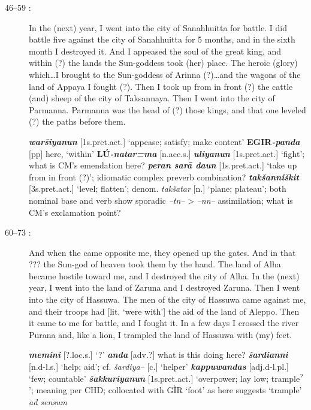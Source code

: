 \documentclass[10pt]{article}
\newcommand{\supersc}[1]{$^{\textrm{\scriptsize{#1}}}$}  	%
\newcommand{\bit}[1]{\textbf{\textit{#1}}}				%
\newcommand{\p}[1]{{\tiny[{#1}]}}					%
\newcommand{\hith}{\textsubwedge{h}}
\renewcommand{\.}[1]{\textsubdot{#1}}
\begin{document}
\begin{description}
\begin{notes}
\end{notes}

\item[46--59 :] In the (next) year, I went into the city of Sanahhuitta for battle. I did battle five against the city of Sanahhuitta for 5 months, and in the sixth month I destroyed it. And I appeased the soul of the great king, and within (?) the lands the Sun-goddess took (her) place. The heroic (glory) which{\ldots}I brought to the Sun-goddess of Arinna (?){\ldots}and the wagons of the land of Appaya I fought (?). Then I took up from in front (?) the cattle (and) sheep of the city of Taksannaya. Then I went into the city of Parmanna. Parmanna was the head of (?) those kings, and that one leveled (?) the paths before them. 


\begin{notes}

\bit{war\v{s}iyanun} \p{1s.pret.act.} `appease; satisfy; make content' \textbf{EGIR}\bit{-panda} \p{pp} here, `within' \textbf{L\'U}\bit{-natar=ma} \p{n.acc.s.} \bit{{\hith}uliyanun} \p{1s.pret.act.} `fight'; what is CM's emendation here? \bit{peran sar\=a da{\hith}{\hith}un} \p{1s.pret.act.} `take up from in front (?)'; idiomatic complex preverb combination? \bit{tak\v{s}anni\v{s}kit} \p{3s.pret.act.} `level; flatten'; denom. \textit{tak\v{s}atar} \p{n.} `plane; plateau'; both nominal base and verb show sporadic \textit{--tn--} > \textit{--nn--} assimilation; what is CM's exclamation point?

\end{notes}

\item[60--73 :] And when the came opposite me, they opened up the gates. And in that ??? the Sun-god of heaven took them by the hand. The land of Alha became hostile toward me, and I destroyed the city of Alha. In the (next) year, I went into the land of Zaruna and I destroyed Zaruna. Then I went into the city of Hassuwa. The men of the city of Hassuwa came against me, and their troops had [lit. `were with'] the aid of the land of Aleppo. Then it came to me for battle, and I fought it. In a few days I crossed the river Purana and, like a lion, I trampled the land of Hassuwa with (my) feet. 


\begin{notes}

\bit{memini} \p{?.loc.s.} `?' \bit{anda} \p{adv.?} what is this doing here? \bit{\v{s}ardianni} \p{n.d-l.s.} `help; aid'; cf. \textit{\v{s}ardiya--} \p{c.} `helper' \bit{kappuwandas} \p{adj.d-l.pl.} `few; countable' \bit{\v{s}akkuriyanun} \p{1s.pret.act.} `overpower; lay low; trample\supersc{?}'; meaning per CHD; collocated with G\`IR `foot' as here suggests `trample' \textit{ad sensum}


\end{notes}
\end{description}
\end{document}
